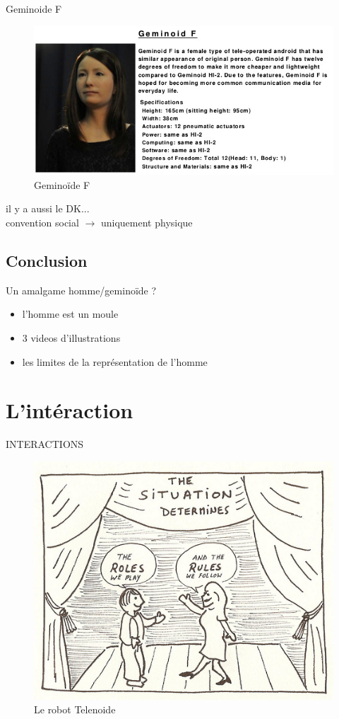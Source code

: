\documentclass{beamer}
\begin{document}
\begin{frame}{Geminoide F}
  \begin{figure}
    \centering
    \includegraphics[width=\textwidth]{data/geminoid-F}
    \caption{Geminoïde F}
  \end{figure}
  il y a aussi le DK...\\
  convention social $\rightarrow$ uniquement physique
\end{frame}

\subsection{Conclusion}
\begin{frame}{Un amalgame homme/geminoïde ?}
  \begin{itemize}
  \item l'homme est un moule
  \item 3 videos d'illustrations
  \item les limites de la représentation de l'homme
  \end{itemize}
\end{frame}

\section{L'intéraction}
\begin{frame}{INTERACTIONS}
  \begin{figure}
    \centering
    \includegraphics[width=\textwidth]{data/interaction}
    \caption{Le robot Telenoide}
  \end{figure}
\end{frame}
\end{document}
